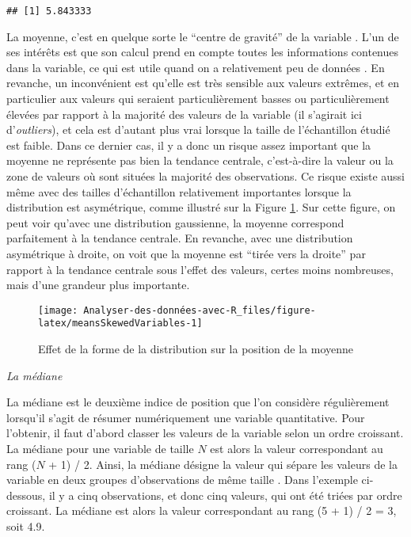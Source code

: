 \documentclass[
  french,
]{book}
\begin{document}
\begin{verbatim}
## [1] 5.843333
\end{verbatim}

La moyenne, c'est en quelque sorte le \enquote{centre de gravité} de la variable \autocite{navarroLearningStatistics2018}. L'un de ses intérêts est que son calcul prend en compte toutes les informations contenues dans la variable, ce qui est utile quand on a relativement peu de données \autocite{navarroLearningStatistics2018}. En revanche, un inconvénient est qu'elle est très sensible aux valeurs extrêmes, et en particulier aux valeurs qui seraient particulièrement basses ou particulièrement élevées par rapport à la majorité des valeurs de la variable (il s'agirait ici d'\emph{outliers}), et cela est d'autant plus vrai lorsque la taille de l'échantillon étudié est faible. Dans ce dernier cas, il y a donc un risque assez important que la moyenne ne représente pas bien la tendance centrale, c'est-à-dire la valeur ou la zone de valeurs où sont situées la majorité des observations. Ce risque existe aussi même avec des tailles d'échantillon relativement importantes lorsque la distribution est asymétrique, comme illustré sur la Figure \ref{fig:meansSkewedVariables}. Sur cette figure, on peut voir qu'avec une distribution gaussienne, la moyenne correspond parfaitement à la tendance centrale. En revanche, avec une distribution asymétrique à droite, on voit que la moyenne est \enquote{tirée vers la droite} par rapport à la tendance centrale sous l'effet des valeurs, certes moins nombreuses, mais d'une grandeur plus importante.

\begin{figure}

{\centering \texttt{[image: Analyser-des-données-avec-R\_files/figure-latex/meansSkewedVariables-1]} 

}

\caption{Effet de la forme de la distribution sur la position de la moyenne}\label{fig:meansSkewedVariables}
\end{figure}

\emph{La médiane}

La médiane est le deuxième indice de position que l'on considère régulièrement lorsqu'il s'agit de résumer numériquement une variable quantitative. Pour l'obtenir, il faut d'abord classer les valeurs de la variable selon un ordre croissant. La médiane pour une variable de taille \(N\) est alors la valeur correspondant au rang (\(N\) + 1) / 2. Ainsi, la médiane désigne la valeur qui sépare les valeurs de la variable en deux groupes d'observations de même taille \autocite{chatellierMoyenneMedianeLeurs2003}. Dans l'exemple ci-dessous, il y a cinq observations, et donc cinq valeurs, qui ont été triées par ordre croissant. La médiane est alors la valeur correspondant au rang (5 + 1) / 2 = 3, soit 4.9.
\end{document}
